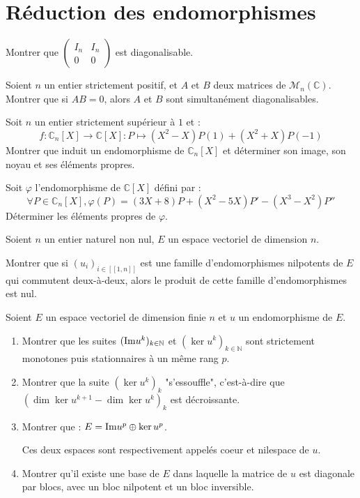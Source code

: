 \section{R\'eduction des endomorphismes}

\begin{exer}
Montrer que $\begin{pmatrix}I_n & I_n\\0&0\end{pmatrix}$ est diagonalisable.
\end{exer}

\begin{exer}
Soient $n$ un entier strictement positif, et $A$ et $B$ deux matrices de $\mathcal{M}_n(\mathbb{C})$. %
Montrer que si $AB=0$, alors $A$ et $B$ sont simultan\'ement diagonalisables.
\end{exer}

\begin{exer}
Soit $n$ un entier strictement sup\'erieur \`a $1$ et :\[f:\mathbb{C}_n[X] \rightarrow \mathbb{C}[X] : P\mapsto (X^2-X)P(1)+(X^2+X)P(-1)\]
Montrer que induit un endomorphisme de $\mathbb{C}_n[X]$ et d\'eterminer son image, son noyau et ses \'el\'ements propres.
\end{exer}

\begin{exer}
Soit $\varphi$ l'endomorphisme de $\mathbb{C}[X]$ d\'efini par :\[\forall P\in\mathbb{C}_n[X] , \varphi (P)=(3X+8)P+(X^2-5X)P'-(X^3-X^2)P''\]
D\'eterminer les \'el\'ements propres de $\varphi$.
\end{exer}

\begin{exer}
Soient $n$ un entier naturel non nul, $E$ un espace vectoriel de dimension $n$.

Montrer que si $(u_i)_{i \in [\![1,n]\!]}$ est une famille d'endomorphismes nilpotents de $E$ qui commutent deux-à-deux, %
alors le produit de cette famille d'endomorphismes est nul.
\end{exer}

\begin{exer}
Soient $E$ un espace vectoriel de dimension finie $n$ et $u$ un endomorphisme de $E$.
\begin{enumerate}
\item Montrer que les suites $(\textup{Im} u^k)_{k\in\mathbb{N}}$ et $(\ker u^k)_{k\in\mathbb{N}}$ sont strictement monotones puis stationnaires à un m\^eme rang $p$.
\item Montrer que la suite $(\ker u^k)_k$ "s'essouffle", c'est-à-dire que $(\dim \ker u^{k+1} - \dim \ker u^k)_k$ est décroissante.
\item Montrer que : $E = \textup{Im} u^p \oplus \ker u^p$.

Ces deux espaces sont respectivement appelés coeur et nilespace de $u$.
\item Montrer qu'il existe une base de $E$ dans laquelle la matrice de $u$ est diagonale par blocs, avec un bloc nilpotent et un bloc inversible.
\end{enumerate}
\end{exer}

